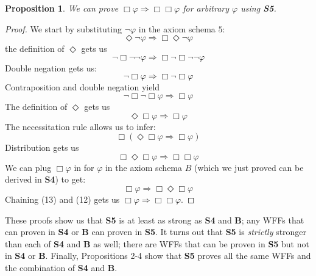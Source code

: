 \documentclass[11pt]{article}
\newtheorem{proposition}[theorem]{Proposition}
\theoremstyle{definition}
\theoremstyle{remark}
\begin{document}
\begin{proposition}
    We can prove $\Box \varphi \Rightarrow \Box\Box\varphi$ for arbitrary $\varphi$ using \textbf{S5}.
\end{proposition}
\begin{proof}
    We start by substituting $\neg \varphi$ in the axiom schema $5$:
    \begin{equation}
        \Diamond\neg \varphi \Rightarrow \Box\Diamond\neg \varphi
    \end{equation}
    the definition of $\Diamond$ gets us
    \begin{equation}
        \neg\Box\neg\neg \varphi \Rightarrow \Box\neg\Box\neg\neg \varphi
    \end{equation}
    Double negation gets us:
    \begin{equation}
        \neg\Box \varphi \Rightarrow \Box\neg\Box \varphi
    \end{equation}
    Contraposition and double negation yield
    \begin{equation}
        \neg\Box\neg\Box \varphi \Rightarrow \Box \varphi
    \end{equation}
    The definition of $\Diamond$ gets us
    \begin{equation}
        \Diamond\Box \varphi \Rightarrow \Box \varphi
    \end{equation}
    The necessitation rule allows us to infer:
    \begin{equation}
        \Box(\Diamond\Box \varphi \Rightarrow \Box \varphi)
    \end{equation}
    Distribution gets us
    \begin{equation}
        \Box\Diamond\Box \varphi \Rightarrow \Box\Box \varphi
    \end{equation}
    We can plug $\Box \varphi$ in for $\varphi$ in the axiom schema $B$ (which we just proved can be derived in \textbf{S4}) to get:
    \begin{equation}
        \Box \varphi\Rightarrow \Box\Diamond\Box \varphi 
    \end{equation}
    Chaining (13) and (12) gets us $\Box \varphi \Rightarrow \Box\Box \varphi$.
\end{proof}
\noindent
These proofs show us that \textbf{S5} is at least as strong as \textbf{S4} and \textbf{B}; any WFFs that can proven in \textbf{S4} or \textbf{B} can proven in \textbf{S5}. It turns out that \textbf{S5} is \textit{strictly} stronger than each of \textbf{S4} and \textbf{B} as well; there are WFFs that can be proven in \textbf{S5} but not in \textbf{S4} or \textbf{B}. Finally, Propositions 2-4 show that \textbf{S5} proves all the same WFFs and the combination of \textbf{S4} and \textbf{B}.
 
\end{document}
